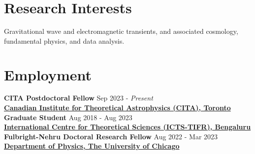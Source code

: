 		
		\section{Research Interests}
		Gravitational wave and electromagnetic transients, and associated cosmology, fundamental physics, and data analysis.
		
		\section{Employment}
        \textbf{CITA Postdoctoral Fellow} \hfill Sep 2023 - \textit{Present}
		\\
            \vspace{0.4em}\textbf{\href{https://www.cita.utoronto.ca/}{Canadian Institute for Theoretical Astrophysics (CITA), Toronto}}\\
            \textbf{Graduate Student} \hfill Aug 2018 - Aug 2023
		\\
		\vspace{0.4em}\textbf{\href{https://www.icts.res.in/}{International Centre for Theoretical Sciences (ICTS-TIFR), Bengaluru}}\\
		\textbf{Fulbright-Nehru Doctoral Research Fellow } \hfill Aug 2022 - Mar 2023
		\\
		\textbf{\href{https://physics.uchicago.edu/}{Department of Physics, The University of Chicago}}
		
		
